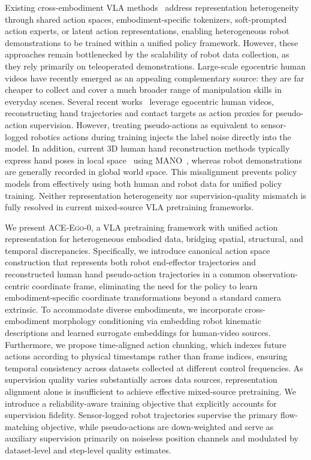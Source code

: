 \documentclass{article}
\newcommand{\OURS}{\textsc{ACE-Ego-0}\xspace}
\newcommand{\Ours}{\OURS}
\begin{document}
Existing cross-embodiment VLA methods~\cite{o2024open,octo_2023,wang2024hpt,bjorck2025gr00t,zheng2025x} address representation heterogeneity through shared action spaces, embodiment-specific tokenizers, soft-prompted action experts, or latent action representations, enabling heterogeneous robot demonstrations to be trained within a unified policy framework. However, these approaches remain bottlenecked by the scalability of robot data collection, as they rely primarily on teleoperated demonstrations.
Large-scale egocentric human videos have recently emerged as an appealing complementary source: they are far cheaper to collect and cover a much broader range of manipulation skills in everyday scenes. Several recent works~\cite{bjorck2025gr00t,kareer2024egomimic,yang2025egovla,fu2024humanplus} leverage egocentric human videos, reconstructing hand trajectories and contact targets as action proxies for pseudo-action supervision. However, treating pseudo-actions as equivalent to sensor-logged robotics actions during training injects the label noise directly into the model. In addition, current 3D human hand reconstruction methods typically express hand poses in local space~\cite{pavlakos2024reconstructing,wilor} using MANO~\cite{romero2022embodied}, whereas robot demonstrations are generally recorded in global world space. This misalignment prevents policy models from effectively using both human and robot data for unified policy training. Neither representation heterogeneity nor supervision-quality mismatch is fully resolved in current mixed-source VLA pretraining frameworks.

We present \Ours, a VLA pretraining framework with unified action representation for heterogeneous embodied data, bridging spatial, structural, and temporal discrepancies. Specifically, we introduce canonical action space construction that represents both robot end-effector trajectories and reconstructed human hand pseudo-action trajectories in a common observation-centric coordinate frame, eliminating the need for the policy to learn embodiment-specific coordinate transformations beyond a standard camera extrinsic. To accommodate diverse embodiments, we incorporate cross-embodiment morphology conditioning via embedding robot kinematic descriptions and learned surrogate embeddings for human-video sources. Furthermore, we propose time-aligned action chunking, which indexes future actions according to physical timestamps rather than frame indices, ensuring temporal consistency across datasets collected at different control frequencies. As supervision quality varies substantially across data sources, representation alignment alone is insufficient to achieve effective mixed-source pretraining. We introduce a reliability-aware training objective that explicitly accounts for supervision fidelity. Sensor-logged robot trajectories supervise the primary flow-matching objective, while pseudo-actions are down-weighted and serve as auxiliary supervision primarily on noiseless position channels and modulated by dataset-level and step-level quality estimates. 
\end{document}
